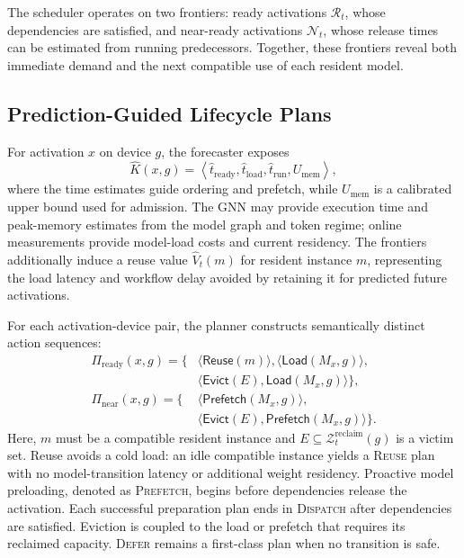 \documentclass{article}
\begin{document}
The scheduler operates on two frontiers: ready activations
$\mathcal{R}_t$, whose dependencies are satisfied, and near-ready activations
$\mathcal{N}_t$, whose release times can be estimated from running
predecessors. Together, these frontiers reveal both immediate demand and the
next compatible use of each resident model.

\subsection{Prediction-Guided Lifecycle Plans}

For activation $x$ on device $g$, the forecaster exposes
\begin{equation}
    \widehat{K}(x,g)=\left\langle
        \hat{t}_{\mathrm{ready}},
        \hat{t}_{\mathrm{load}},
        \hat{t}_{\mathrm{run}},
        U_{\mathrm{mem}}
    \right\rangle,
    \label{eq:lifecycle-contract}
\end{equation}
where the time estimates guide ordering and prefetch, while
$U_{\mathrm{mem}}$ is a calibrated upper bound used for admission. The GNN may
provide execution time and peak-memory estimates from the model graph and token
regime; online measurements provide model-load costs and current residency.
The frontiers additionally induce a reuse value $\widehat{V}_t(m)$ for resident
instance $m$, representing the load latency and workflow delay avoided by
retaining it for predicted future activations.

For each activation-device pair, the planner constructs semantically distinct
action sequences:
\begin{equation}
    \begin{aligned}
        \Pi_{\mathrm{ready}}(x,g)=\{&
        \langle\mathsf{Reuse}(m)\rangle,
        \langle\mathsf{Load}(M_x,g)\rangle,\\
        &\langle\mathsf{Evict}(E),\mathsf{Load}(M_x,g)\rangle\},\\
        \Pi_{\mathrm{near}}(x,g)=\{&
        \langle\mathsf{Prefetch}(M_x,g)\rangle,\\
        &\langle\mathsf{Evict}(E),\mathsf{Prefetch}(M_x,g)\rangle\}.
    \end{aligned}
    \label{eq:lifecycle-plans}
\end{equation}
Here, $m$ must be a compatible resident instance and
$E\subseteq\mathcal{Z}^{\mathrm{reclaim}}_t(g)$ is a victim set. Reuse avoids a
cold load: an idle compatible instance yields a \textsc{Reuse} plan with no
model-transition latency or additional weight residency. Proactive model
preloading, denoted as \textsc{Prefetch}, begins before dependencies release the
activation. Each successful preparation plan ends in \textsc{Dispatch} after
dependencies are satisfied. Eviction is coupled to the load or prefetch that
requires its reclaimed capacity. \textsc{Defer} remains a first-class plan when
no transition is safe.
\end{document}
